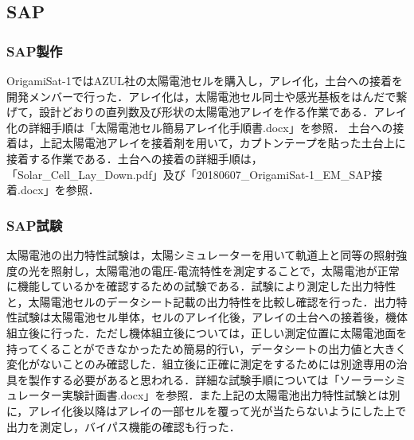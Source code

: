 \subsection{SAP}
\subsubsection{SAP製作}
OrigamiSat-1ではAZUL社の太陽電池セルを購入し，アレイ化，土台への接着を開発メンバーで行った．アレイ化は，太陽電池セル同士や感光基板をはんだで繋げて，設計どおりの直列数及び形状の太陽電池アレイを作る作業である．アレイ化の詳細手順は「太陽電池セル簡易アレイ化手順書.docx」を参照．
土台への接着は，上記太陽電池アレイを接着剤を用いて，カプトンテープを貼った土台上に接着する作業である．土台への接着の詳細手順は，「Solar\_Cell\_Lay\_Down.pdf」及び「20180607\_OrigamiSat-1\_EM\_SAP接着.docx」を参照．
\subsubsection{SAP試験}
太陽電池の出力特性試験は，太陽シミュレーターを用いて軌道上と同等の照射強度の光を照射し，太陽電池の電圧-電流特性を測定することで，太陽電池が正常に機能しているかを確認するための試験である．試験により測定した出力特性と，太陽電池セルのデータシート記載の出力特性を比較し確認を行った．出力特性試験は太陽電池セル単体，セルのアレイ化後，アレイの土台への接着後，機体組立後に行った．ただし機体組立後については，正しい測定位置に太陽電池面を持ってくることができなかったため簡易的行い，データシートの出力値と大きく変化がないことのみ確認した．組立後に正確に測定をするためには別途専用の治具を製作する必要があると思われる．詳細な試験手順については「ソーラーシミュレーター実験計画書.docx」を参照．また上記の太陽電池出力特性試験とは別に，アレイ化後以降はアレイの一部セルを覆って光が当たらないようにした上で出力を測定し，バイパス機能の確認も行った．


